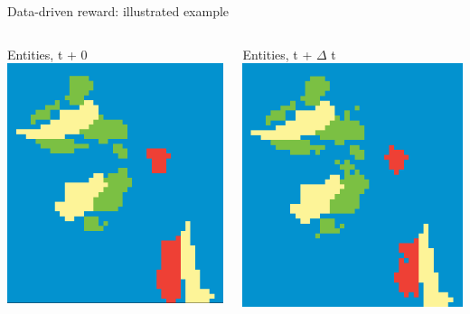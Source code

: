 \documentclass[9pt,xcolor=table]{beamer}
\begin{document}
\begin{frame}{Data-driven reward: illustrated example}
    \begin{columns}
        \begin{column}{0.25\textwidth}
            Entities, t + 0
            \includegraphics[width=\textwidth,trim={0cm 0cm 0cm 0cm},clip]{img/ep0.png}
        \end{column}
        \begin{column}{0.25\textwidth}
            Entities, t + $\Delta$ t
            \includegraphics[width=\textwidth,trim={0cm 0cm 0cm 0cm},clip]{img/ep1.png}

\end{column}
\end{columns}
\end{frame}
\end{document}
